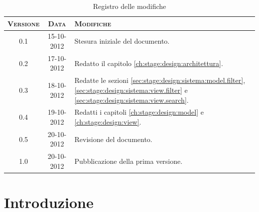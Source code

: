 \documentclass[10pt,a4paper,headinclude,footinclude,hidelinks]{scrreprt} %
\begin{document}
    \title{\rmfamily\normalfont{}}
    \author{}
    \date{\today}
    
    \maketitle
    
    \begin{abstract}
        \noindent Il documento riporta le informazioni di progettazione riguardanti l'interfaccia grafica per la visualizzazione e la navigazione dei contenuti.
    \end{abstract}
    
	\begin{table}[ht]
	\centering
	\begin{tabular}{|c|c|l|}
	\hline
	\textsc{Versione} & \textsc{Data} & \textsc{Modifiche} \\ \hline
	0.1 & 15-10-2012 & Stesura iniziale del documento. \\ \hline
	0.2 & 17-10-2012 & Redatto il capitolo \ref{ch:stage:design:architettura}. \\ \hline
	0.3 & 18-10-2012 & Redatte le sezioni \ref{sec:stage:design:sistema:model.filter}, \ref{sec:stage:design:sistema:view.filter} e \ref{sec:stage:design:sistema:view.search}. \\ \hline
	0.4 & 19-10-2012 & Redatti i capitoli \ref{ch:stage:design:model} e \ref{ch:stage:design:view}. \\ \hline
	0.5 & 20-10-2012 & Revisione del documento. \\ \hline
	1.0 & 20-10-2012 & Pubblicazione della prima versione. \\ \hline
	\end{tabular}
	\caption{Registro delle modifiche}
	\label{tab:stage:wp:workload}
	\end{table}

	\tableofcontents

	\chapter{Introduzione}
	\label{ch:stage:design:intro}

\end{document}
